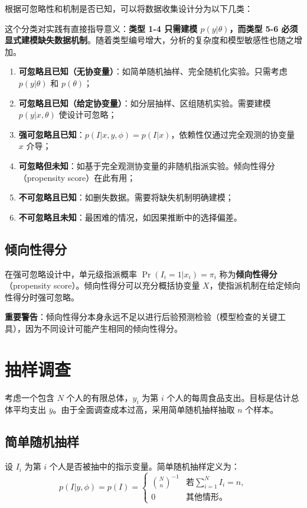根据可忽略性和机制是否已知，可以将数据收集设计分为以下几类：

这个分类对实践有直接指导意义：\textbf{类型 1-4 只需建模 $p(y|\theta)$，而类型 5-6 必须显式建模缺失数据机制}。随着类型编号增大，分析的复杂度和模型敏感性也随之增加。

\begin{enumerate}
  \item \textbf{可忽略且已知（无协变量）}：如简单随机抽样、完全随机化实验。只需考虑 $p(y|\theta)$ 和 $p(\theta)$；
  \item \textbf{可忽略且已知（给定协变量）}：如分层抽样、区组随机实验。需要建模 $p(y|x,\theta)$ 使设计可忽略；
  \item \textbf{强可忽略且已知}：$p(I|x, y, \phi) = p(I|x)$，依赖性仅通过完全观测的协变量 $x$ 介导；
  \item \textbf{可忽略但未知}：如基于完全观测协变量的非随机指派实验。倾向性得分（propensity score）在此有用；
  \item \textbf{不可忽略且已知}：如删失数据。需要将缺失机制明确建模；
  \item \textbf{不可忽略且未知}：最困难的情况，如因果推断中的选择偏差。
\end{enumerate}

\subsection{倾向性得分}

在强可忽略设计中，单元级指派概率 $\Pr(I_i = 1|x_i) = \pi_i$ 称为\textbf{倾向性得分}（propensity score）。倾向性得分可以充分概括协变量 $X$，使指派机制在给定倾向性得分时强可忽略。

\textbf{重要警告}：倾向性得分本身永远不足以进行后验预测检验（模型检查的关键工具），因为不同设计可能产生相同的倾向性得分。

\section{抽样调查}

考虑一个包含 $N$ 个人的有限总体，$y_i$ 为第 $i$ 个人的每周食品支出。目标是估计总体平均支出 $\bar{y}$。由于全面调查成本过高，采用简单随机抽样抽取 $n$ 个样本。

\subsection{简单随机抽样}

设 $I_i$ 为第 $i$ 个人是否被抽中的指示变量。简单随机抽样定义为：
\begin{equation}
p(I|y, \phi) = p(I) =
\begin{cases}
\binom{N}{n}^{-1} & \text{若} \sum_{i=1}^N I_i = n, \\
0 & \text{其他情形。}
\end{cases}
\end{equation}

